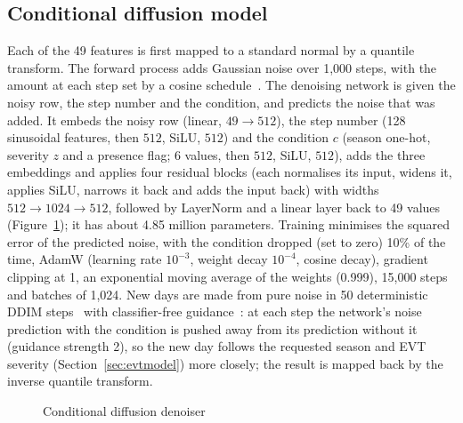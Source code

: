 \documentclass[12pt,a4paper]{report}
\begin{document}
\subsection{Conditional diffusion model}
Each of the 49 features is first mapped to a standard normal by a quantile transform. The forward process adds
Gaussian noise over 1{,}000 steps, with the amount at each step set by a cosine schedule~\cite{nichol2021improved}.
The denoising network is given the noisy row, the step number and the condition, and predicts the noise that was
added. It embeds the noisy row (linear, $49\to512$), the step number (128 sinusoidal features, then $512$, SiLU, $512$) and the
condition $c$ (season one-hot, severity $z$ and a presence flag; 6 values, then $512$, SiLU, $512$), adds the three
embeddings and applies four residual blocks (each normalises its input, widens it, applies SiLU, narrows it back and adds the input back) with widths
$512\to1024\to512$, followed by LayerNorm and a linear layer back to 49 values (Figure~\ref{fig:arch-ddpm}); it has
about 4.85 million parameters. Training minimises the squared error of the predicted noise, with the
condition dropped (set to zero) 10\% of the time, AdamW (learning rate $10^{-3}$, weight decay $10^{-4}$, cosine decay),
gradient clipping at 1, an exponential moving average of the weights (0.999), 15{,}000 steps and batches of 1{,}024.
New days are made from pure noise in 50 deterministic DDIM steps~\cite{song2021ddim} with classifier-free
guidance~\cite{ho2022cfg}: at each step the network's noise prediction with the condition is pushed away from its
prediction without it (guidance strength 2), so the new day follows the requested season and EVT severity
(Section~\ref{sec:evtmodel}) more closely; the result is mapped back by the inverse quantile
transform.

\begin{figure}[H]
\centering
{}
\caption{Conditional diffusion denoiser}
\label{fig:arch-ddpm}
\end{figure}
\end{document}
